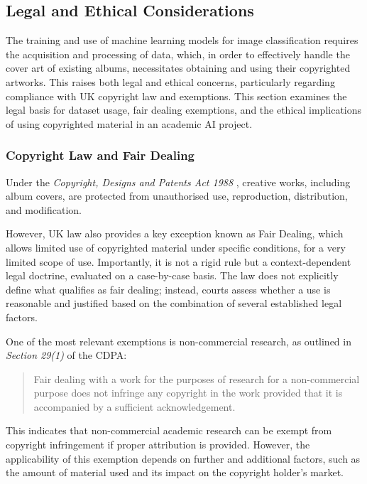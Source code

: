         \subsection{Legal and Ethical Considerations}
    
          The training and use of machine learning models for image classification requires the acquisition and processing of data, which, in order to effectively handle the cover art of existing albums, necessitates obtaining and using their copyrighted artworks. This raises both legal and ethical concerns, particularly regarding compliance with UK copyright law and exemptions. This section examines the legal basis for dataset usage, fair dealing exemptions, and the ethical implications of using copyrighted material in an academic AI project.
    
              \subsubsection{Copyright Law and Fair Dealing}
                  Under the \textit{Copyright, Designs and Patents Act 1988} \cite{cdpa1988}, creative works, including album covers, are protected from unauthorised use, reproduction, distribution, and modification.
          
                  However, UK law also provides a key exception known as Fair Dealing, which allows limited use of copyrighted material under specific conditions, for a very limited scope of use. Importantly, it is not a rigid rule but a context-dependent legal doctrine, evaluated on a case-by-case basis. The law does not explicitly define what qualifies as fair dealing; instead, courts assess whether a use is reasonable and justified based on the combination of several established legal factors.
                  
                  One of the most relevant exemptions is non-commercial research, as outlined in \textit{Section 29(1)} of the CDPA:
                  \begin{quote}
                      Fair dealing with a work for the purposes of research for a non-commercial purpose does not infringe any copyright in the work provided that it is accompanied by a sufficient acknowledgement. \cite{cdpa1988}
                  \end{quote}
    
                  This indicates that non-commercial academic research can be exempt from copyright infringement if proper attribution is provided. However, the applicability of this exemption depends on further and additional factors, such as the amount of material used and its impact on the copyright holder’s market.
    
